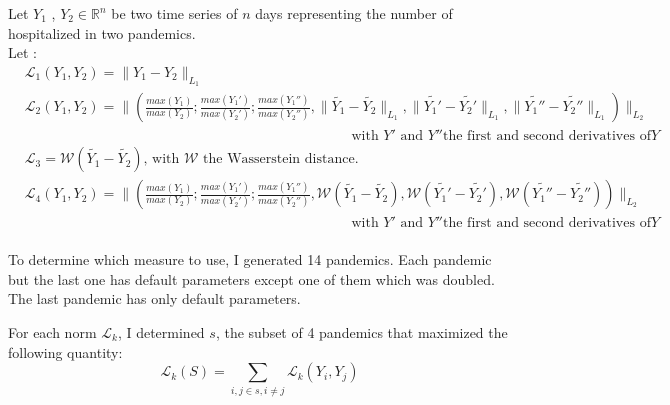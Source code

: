 Let $Y_1$ ,  $Y_2 \in \mathbb{R}^n$  be two time series of $n$ days representing the number of hospitalized in two pandemics.  \\[0.2cm]

Let :  \\

$
\begin{aligned}
    &\mathcal{L}_1(Y_1, Y_2) = \| Y_1 - Y_2 \|_{L_1}  \\
    &\mathcal{L}_2(Y_1, Y_2) = \| (\frac{max(Y_1)}{max(Y_2)} ;\frac{max(Y_1')}{max(Y_2')} ; \frac{max(Y_1'')}{max(Y_2'')} , \| \tilde{Y_1} - \tilde{Y_2} \|_{L_1}, \| \tilde{Y_1'} - \tilde{Y_2'} \|_{L_1} , \| \tilde{Y_1''} - \tilde{Y_2''} \|_{L_1} ) \|_{L_2} \\
    &\quad \quad\quad\quad\quad \quad\quad\quad \quad\quad\quad\quad \quad\quad\quad\quad \quad\quad\quad\quad \quad\quad\quad\text{ with }Y' \text{ and } Y'' \text{the first and second derivatives of} Y\\
    &\mathcal{L}_3 = \mathcal{W}(\tilde{Y_1} - \tilde{Y_2}) \text{, with }\mathcal{W} \text{ the Wasserstein distance.} \\
    &\mathcal{L}_4(Y_1, Y_2) = \| (\frac{max(Y_1)}{max(Y_2)} ;\frac{max(Y_1')}{max(Y_2')} ; \frac{max(Y_1'')}{max(Y_2'')} , \mathcal{W} (\tilde{Y_1} - \tilde{Y_2} ),\mathcal{W} ( \tilde{Y_1'} - \tilde{Y_2'} ) , \mathcal{W} (\tilde{Y_1''} - \tilde{Y_2''} ) ) \|_{L_2} \\
    &\quad \quad\quad\quad\quad \quad\quad\quad \quad\quad\quad\quad \quad\quad\quad\quad \quad\quad\quad\quad \quad\quad\quad\text{ with }Y' \text{ and } Y'' \text{the first and second derivatives of} Y\\[1cm]
\end{aligned}
$


To determine which measure to use, I generated 14 pandemics. 
Each pandemic but the last one has default parameters except one of them which was doubled. 
The last pandemic has only default parameters. 

For each norm $\mathcal{L}_k$, I determined $s$,  the subset of 4 pandemics that maximized the following quantity:\\

\[ \mathcal{L}_k(S) = \sum_{i, j \in s, i \neq j} \mathcal{L}_k(Y_i, Y_j) \]


